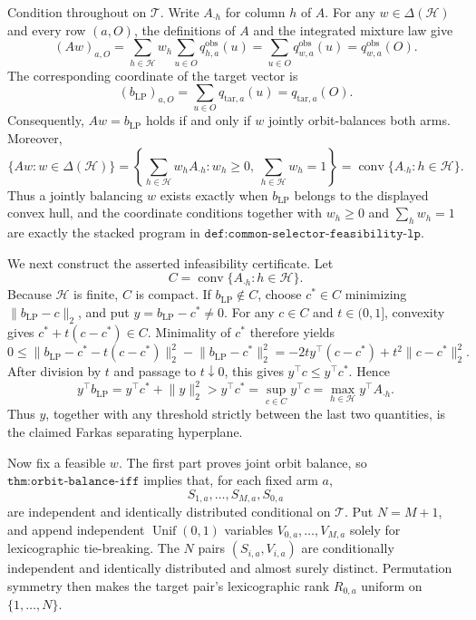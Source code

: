 Condition throughout on \(\mathcal T\). Write \(A_{\cdot h}\) for column \(h\) of \(A\). For any \(w\in\Delta(\mathcal H)\) and every row \((a,O)\), the definitions of \(A\) and the integrated mixture law give
\[
(Aw)_{a,O}=\sum_{h\in\mathcal H}w_h\sum_{u\in O}q^{\mathrm{obs}}_{h,a}(u)=\sum_{u\in O}q^{\mathrm{obs}}_{w,a}(u)=q^{\mathrm{obs}}_{w,a}(O).
\]
The corresponding coordinate of the target vector is
\[
(b_{\mathrm{LP}})_{a,O}=\sum_{u\in O}q_{\mathrm{tar},a}(u)=q_{\mathrm{tar},a}(O).
\]
Consequently, \(Aw=b_{\mathrm{LP}}\) holds if and only if \(w\) jointly orbit-balances both arms. Moreover,
\[
\{Aw:w\in\Delta(\mathcal H)\}=\left\{\sum_{h\in\mathcal H}w_hA_{\cdot h}:w_h\ge0,\ \sum_{h\in\mathcal H}w_h=1\right\}=\operatorname{conv}\{A_{\cdot h}:h\in\mathcal H\}.
\]
Thus a jointly balancing \(w\) exists exactly when \(b_{\mathrm{LP}}\) belongs to the displayed convex hull, and the coordinate conditions together with \(w_h\ge0\) and \(\sum_h w_h=1\) are exactly the stacked program in \(\texttt{def:common-selector-feasibility-lp}\).

We next construct the asserted infeasibility certificate. Let
\[
C=\operatorname{conv}\{A_{\cdot h}:h\in\mathcal H\}.
\]
Because \(\mathcal H\) is finite, \(C\) is compact. If \(b_{\mathrm{LP}}\notin C\), choose \(c^*\in C\) minimizing \(\lVert b_{\mathrm{LP}}-c\rVert_2\), and put \(y=b_{\mathrm{LP}}-c^*\ne0\). For any \(c\in C\) and \(t\in(0,1]\), convexity gives \(c^*+t(c-c^*)\in C\). Minimality of \(c^*\) therefore yields
\[
0\le\lVert b_{\mathrm{LP}}-c^*-t(c-c^*)\rVert_2^2-\lVert b_{\mathrm{LP}}-c^*\rVert_2^2=-2t y^\top(c-c^*)+t^2\lVert c-c^*\rVert_2^2.
\]
After division by \(t\) and passage to \(t\downarrow0\), this gives \(y^\top c\le y^\top c^*\). Hence
\[
y^\top b_{\mathrm{LP}}=y^\top c^*+\lVert y\rVert_2^2>y^\top c^*=\sup_{c\in C}y^\top c=\max_{h\in\mathcal H}y^\top A_{\cdot h}.
\]
Thus \(y\), together with any threshold strictly between the last two quantities, is the claimed Farkas separating hyperplane.

Now fix a feasible \(w\). The first part proves joint orbit balance, so \(\texttt{thm:orbit-balance-iff}\) implies that, for each fixed arm \(a\),
\[
S_{1,a},\ldots,S_{M,a},S_{0,a}
\]
are independent and identically distributed conditional on \(\mathcal T\). Put \(N=M+1\), and append independent \(\operatorname{Unif}(0,1)\) variables \(V_{0,a},\ldots,V_{M,a}\) solely for lexicographic tie-breaking. The \(N\) pairs \((S_{i,a},V_{i,a})\) are conditionally independent and identically distributed and almost surely distinct. Permutation symmetry then makes the target pair's lexicographic rank \(R_{0,a}\) uniform on \(\{1,\ldots,N\}\).

